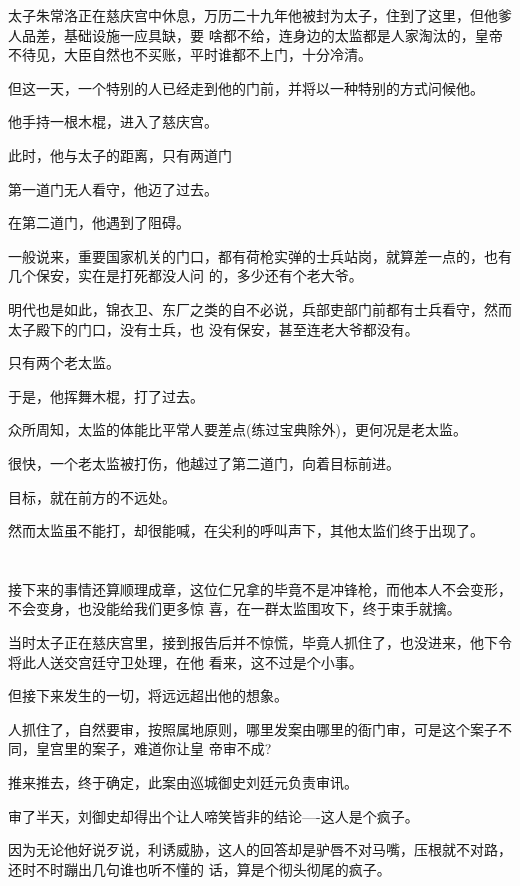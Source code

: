 \documentclass[11pt,a4paper,onecolumn]{article}
\begin{document}
太子朱常洛正在慈庆宫中休息，万历二十九年他被封为太子，住到了这里，但他爹人品差，基础设施一应具缺，要
啥都不给，连身边的太监都是人家淘汰的，皇帝不待见，大臣自然也不买账，平时谁都不上门，十分冷清。

但这一天，一个特别的人已经走到他的门前，并将以一种特别的方式问候他。

他手持一根木棍，进入了慈庆宫。

此时，他与太子的距离，只有两道门

第一道门无人看守，他迈了过去。

在第二道门，他遇到了阻碍。

一般说来，重要国家机关的门口，都有荷枪实弹的士兵站岗，就算差一点的，也有几个保安，实在是打死都没人问
的，多少还有个老大爷。

明代也是如此，锦衣卫、东厂之类的自不必说，兵部吏部门前都有士兵看守，然而太子殿下的门口，没有士兵，也
没有保安，甚至连老大爷都没有。

只有两个老太监。

于是，他挥舞木棍，打了过去。

众所周知，太监的体能比平常人要差点(练过宝典除外)，更何况是老太监。

很快，一个老太监被打伤，他越过了第二道门，向着目标前进。

目标，就在前方的不远处。

然而太监虽不能打，却很能喊，在尖利的呼叫声下，其他太监们终于出现了。

\section[\thesection]{}

接下来的事情还算顺理成章，这位仁兄拿的毕竟不是冲锋枪，而他本人不会变形，不会变身，也没能给我们更多惊
喜，在一群太监围攻下，终于束手就擒。

当时太子正在慈庆宫里，接到报告后并不惊慌，毕竟人抓住了，也没进来，他下令将此人送交宫廷守卫处理，在他
看来，这不过是个小事。

但接下来发生的一切，将远远超出他的想象。

人抓住了，自然要审，按照属地原则，哪里发案由哪里的衙门审，可是这个案子不同，皇宫里的案子，难道你让皇
帝审不成?

推来推去，终于确定，此案由巡城御史刘廷元负责审讯。

审了半天，刘御史却得出个让人啼笑皆非的结论----这人是个疯子。

因为无论他好说歹说，利诱威胁，这人的回答却是驴唇不对马嘴，压根就不对路，还时不时蹦出几句谁也听不懂的
话，算是个彻头彻尾的疯子。
\end{document}
